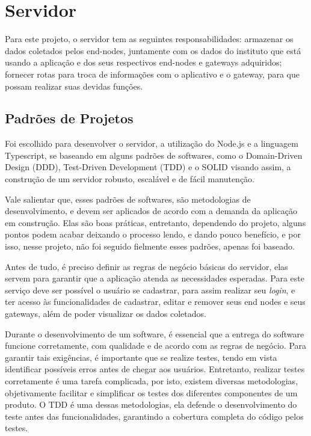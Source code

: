 \section{Servidor}
\label{metod:servidor}
Para este projeto, o servidor tem as seguintes responsabilidades: armazenar os dados coletados pelos end-nodes, juntamente com os dados do instituto que está usando a aplicação e dos seus respectivos end-nodes e gateways adquiridos; fornecer rotas para troca de informações com o aplicativo e o gateway, para que possam realizar suas devidas funções.

\subsection{Padrões de Projetos}
\label{metod:servidor:padroes}
Foi escolhido para desenvolver o servidor, a utilização do Node.js e a linguagem Typescript, se baseando em alguns padrões de softwares, como o Domain-Driven Design (DDD), Test-Driven Development (TDD) e o SOLID visando assim, a construção de um servidor robusto, escalável e de fácil manutenção.

Vale salientar que, esses padrões de softwares, são metodologias de desenvolvimento, e devem ser aplicados de acordo com a demanda da aplicação em construção. Elas são boas práticas, entretanto, dependendo do projeto, alguns pontos podem acabar deixando o processo lendo, e dando pouco benefício, e por isso, nesse projeto, não foi seguido fielmente esses padrões, apenas foi baseado.

Antes de tudo, é preciso definir as regras de negócio básicas do servidor, elas servem para garantir que a aplicação atenda as necessidades esperadas. Para este serviço deve ser possível o usuário se cadastrar, para assim realizar seu \textit{login}, e ter acesso às funcionalidades de cadastrar, editar e remover seus end nodes e seus gateways, além de poder visualizar os dados coletados.

Durante o desenvolvimento de um software, é essencial que a entrega do software funcione corretamente, com qualidade e de acordo com as regras de negócio. Para garantir tais exigências, é importante que se realize testes, tendo em vista identificar possíveis erros antes de chegar aos usuários. Entretanto, realizar testes corretamente é uma tarefa complicada, por isto, existem diversas metodologias, objetivamente facilitar e simplificar os testes dos diferentes componentes de um produto. O TDD é uma dessas metodologias, ela defende o desenvolvimento do teste antes das funcionalidades, garantindo a cobertura completa do código pelos testes.

